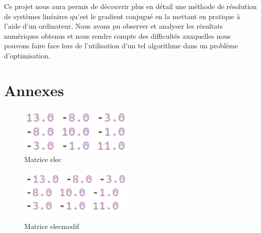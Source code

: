 \documentclass[12,french]{report}
\begin{document}
Ce projet nous aura permis de découvrir plus en détail une méthode de résolution de systèmes linéaires qu'est le gradient conjugué en la mettant en pratique à l'aide d'un ordinateur. Nous avons pu observer et analyser les résultats numériques obtenus et nous rendre compte des difficultés auxquelles nous pouvons faire face lors de l'utilisation d'un tel algorithme dans un problème d'optimisation.

\chapter*{Annexes}
\begin{figure}[H]
    \begin{minipage}[c]{.46\linewidth}
        \centering
        \includegraphics[width=0.5\textwidth]{./Images/elec}\\
        \caption*{Matrice elec}
    \end{minipage}
    \hfill%
    \begin{minipage}[c]{.46\linewidth}
        \centering
        \includegraphics[width=0.5\textwidth]{./Images/elecmodif}\\
        \caption*{Matrice elecmodif}
    \end{minipage}
\end{figure}%
\end{document}

